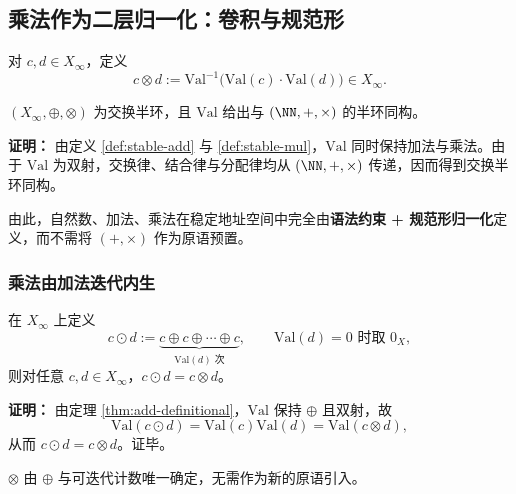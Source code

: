 \subsection{乘法作为二层归一化：卷积与规范形}\label{subsec:emergent-arithmetic-stable-mul}

\begin{definition}[稳定乘法]\label{def:stable-mul}
对 $c,d\in X_\infty$，定义
\[
c\otimes d:=\mathrm{Val}^{-1}\bigl(\mathrm{Val}(c)\cdot\mathrm{Val}(d)\bigr)\in X_\infty.
\]
\end{definition}

\begin{theorem}\label{thm:mul-definitional}
$(X_\infty,\oplus,\otimes)$ 为交换半环，且 $\mathrm{Val}$ 给出与 $(\NN,+,\times)$ 的半环同构。
\end{theorem}

\textbf{证明：}
由定义 \ref{def:stable-add} 与 \ref{def:stable-mul}，$\mathrm{Val}$ 同时保持加法与乘法。由于 $\mathrm{Val}$ 为双射，交换律、结合律与分配律均从 $(\NN,+,\times)$ 传递，因而得到交换半环同构。

由此，自然数、加法、乘法在稳定地址空间中完全由\textbf{语法约束 + 规范形归一化}定义，而不需将 $(+,\times)$ 作为原语预置。

\subsubsection{乘法由加法迭代内生}\label{subsec:mul-as-iterated-add}
\begin{theorem}[乘法可由加法与迭代内生]\label{thm:mul-by-iterated-add}
在 $X_\infty$ 上定义
\[
c\odot d:=\underbrace{c\oplus c\oplus\cdots\oplus c}_{\mathrm{Val}(d)\text{ 次}},
\qquad
\mathrm{Val}(d)=0\text{ 时取 }0_X,
\]
则对任意 $c,d\in X_\infty$，$c\odot d=c\otimes d$。
\end{theorem}

\textbf{证明：}
由定理 \ref{thm:add-definitional}，$\mathrm{Val}$ 保持 $\oplus$ 且双射，故
\[
\mathrm{Val}(c\odot d)=\mathrm{Val}(c)\mathrm{Val}(d)=\mathrm{Val}(c\otimes d),
\]
从而 $c\odot d=c\otimes d$。证毕。

\begin{corollary}[“合并”的第一种严格版本]\label{cor:mul-no-new-primitive}
$\otimes$ 由 $\oplus$ 与可迭代计数唯一确定，无需作为新的原语引入。
\end{corollary}

